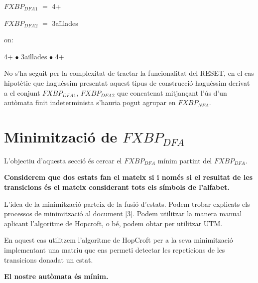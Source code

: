 \documentclass[12pt,a4paper]{report}
\def \dfa{$FXBP_{DFA} $}
\def \nfa{$FXBP_{NFA} $}
\begin{document}
\begin{center}
\dfa$_1$ $=$ 4+
\end{center}

\begin{center}
\dfa$_2$ $=$ 3aïllades
\end{center}

on:

\begin{center}
4+ $\bullet$ 3aïllades $\bullet$ 4+
\end{center}

No s’ha seguit per la complexitat de tractar la funcionalitat del RESET, en el cas hipotètic que haguéssim presentat aquest tipus de construcció haguéssim derivat a el conjunt {\dfa$_1$, \dfa$_2$} que concatenat mitjançant l'ús d'un autòmata finit indeterminista s'hauria pogut agrupar en \nfa{}.

\section{Minimització de \dfa{}}

L’objectiu d’aquesta secció és cercar el \dfa{} mínim partint del \dfa{}.

\textbf{Considerem que dos estats fan el mateix si i només si el resultat de les transicions és el mateix considerant tots els símbols de l’alfabet. }

L'idea de la minimització parteix de la fusió d'estats. Podem trobar explicats els processos de minimització al document [3]. Podem utilitzar la manera manual aplicant l'algoritme de Hopcroft, o bé, podem obtar per utilitzar UTM.

En aquest cas utilitzem l’algoritme de HopCroft per a la seva minimització implementant una matriu que ens permeti detectar les repeticions de les transicions donadat un estat.


\begin{center}
\textbf{El nostre autòmata és mínim.}
\end{center}
\end{document}
